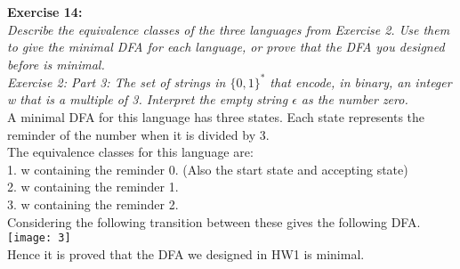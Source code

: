 \documentclass[11pt]{article}
\begin{document}
\begin{flushleft}
\textbf{Exercise 14:} \\
\textit{Describe the equivalence classes of the three languages from Exercise 2. Use them to give the minimal
DFA for each language, or prove that the DFA you designed before is 
minimal.\\
Exercise 2: Part 3: The set of strings in $\{0,1\}^*$ that encode, in binary, an integer w that is a multiple of 3. Interpret the empty string $\epsilon$ as the number zero.}\\
\null
A minimal DFA for this language has three states. Each state represents the reminder of the number when it is divided by 3.\\
\null
The equivalence classes for this language are: \\
1. w containing the reminder 0. (Also the start state and accepting state)\\
2. w containing the reminder 1.\\
3. w containing the reminder 2.\\
\null
Considering the following transition between these gives the following DFA.\\
\texttt{[image: 3]}\\
\null
Hence it is proved that the DFA we designed in HW1 is minimal. \\
\null
\end{flushleft}
\end{document}
